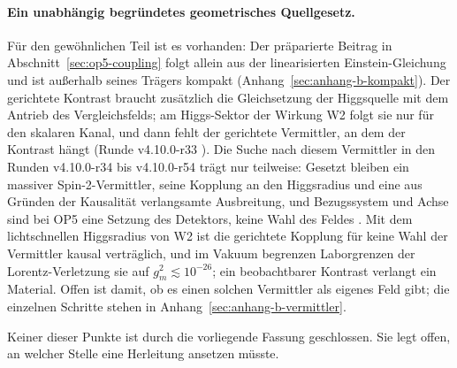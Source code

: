 \paragraph{Ein unabhängig begründetes geometrisches Quellgesetz.}
Für den gewöhnlichen Teil ist es vorhanden: Der präparierte Beitrag in Abschnitt~\ref{sec:op5-coupling} folgt allein aus der
linearisierten Einstein-Gleichung und ist außerhalb seines Trägers kompakt (Anhang~\ref{sec:anhang-b-kompakt}). Der gerichtete Kontrast
braucht zusätzlich die Gleichsetzung der Higgsquelle mit dem Antrieb des Vergleichsfelds; am Higgs-Sektor der Wirkung W2 folgt sie nur für
den skalaren Kanal, und dann fehlt der gerichtete Vermittler, an dem der Kontrast hängt (Runde v4.10.0-r33 \cite{layers}). Die Suche nach
diesem Vermittler in den Runden v4.10.0-r34 bis v4.10.0-r54 trägt nur teilweise: Gesetzt bleiben ein massiver Spin-2-Vermittler, seine
Kopplung an den Higgsradius und eine aus Gründen der Kausalität verlangsamte Ausbreitung, und Bezugssystem und Achse sind bei OP5 eine
Setzung des Detektors, keine Wahl des Feldes \cite{layers}. Mit dem lichtschnellen Higgsradius von W2 ist die gerichtete Kopplung für keine
Wahl der Vermittler kausal verträglich, und im Vakuum begrenzen Laborgrenzen der Lorentz-Verletzung sie auf \(g_m^2\lesssim10^{-26}\); ein
beobachtbarer Kontrast verlangt ein Material. Offen ist damit, ob es einen solchen Vermittler als eigenes Feld gibt; die einzelnen Schritte
stehen in Anhang~\ref{sec:anhang-b-vermittler}.

Keiner dieser Punkte ist durch die vorliegende Fassung geschlossen. Sie legt offen, an welcher Stelle eine Herleitung ansetzen müsste.


